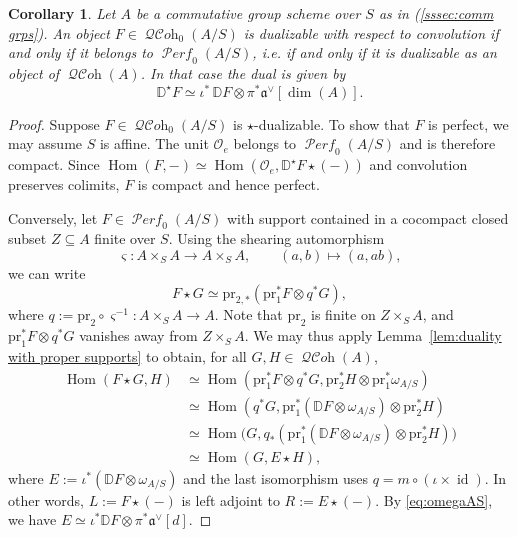 \documentclass[12pt, oneside]{amsart}
\numberwithin{equation}{section}
\newtheorem{corollary}[subsubsection]{Corollary}
\theoremstyle{remark}
\theoremstyle{plain}
\DeclareMathOperator{\QCOH}{\mathcal{QC}\textit{oh}}
\DeclareMathOperator{\PERF}{\mathcal{P}\textit{erf}}
\DeclareMathOperator{\Hom}{Hom}
\newcommand{\frav}{\mathfrak{a}^\vee}
\newcommand{\OO}{\mathcal{O}}
\newcommand{\pr}{\mathrm{pr}}
\begin{document}
\begin{corollary}\label{duals} Let $A$ be a commutative group scheme over $S$ as in (\ref{sssec:comm grps}). An object $F \in \QCOH_0(A/S)$ is dualizable with respect to convolution if and only if it belongs to $\PERF_{0}(A/S)$, i.e. if and only if it is dualizable as an object of $\QCOH(A)$. In that case the dual is given by $$\mathbb{D}^{\star}F\simeq \iota^{*}\,\mathbb{D}F \otimes \pi^{*}\frav[\operatorname{dim}(A)].$$\end{corollary}

\begin{proof}
Suppose $F \in \QCOH_0(A/S)$ is $\star$-dualizable.
To show that $F$ is perfect, we may assume $S$ is affine.
The unit $\OO_e$ belongs to $\PERF_0(A/S)$ and is therefore compact.
Since $\Hom(F,-) \simeq \Hom(\OO_e, \mathbb{D}^\star F\star(-))$ and convolution preserves colimits, $F$ is compact and hence perfect.

Conversely, let $F \in \PERF_0(A/S)$ with support contained in a cocompact closed subset $Z \subseteq A$ finite over $S$.
Using the shearing automorphism
\[
  \varsigma : A\times_S A \to A\times_S A,
  \qquad (a,b) \mapsto (a,ab),
\]
we can write
\[
  F\star G \simeq \pr_{2,*}(\pr_1^*F\otimes q^*G),
\]
where $q := \pr_2 \circ \varsigma^{-1} : A \times_S A \to A$.
Note that $\pr_2$ is finite on $Z\times_S A$, and $\pr_1^*F\otimes q^*G$ vanishes away from $Z\times_S A$.
We may thus apply Lemma~\ref{lem:duality with proper supports} to obtain, for all $G,H\in\QCOH(A)$,
\begin{align*}
  \Hom(F\star G,H)
  &\simeq \Hom(\pr_1^*F\otimes q^*G,
               \pr_2^*H\otimes\pr_1^*\omega_{A/S})\\
  &\simeq \Hom(q^*G,
               \pr_1^*(\mathbb{D}F\otimes\omega_{A/S})
               \otimes\pr_2^*H)\\
  &\simeq \Hom\bigl(G,
               q_*(\pr_1^*(\mathbb{D}F\otimes\omega_{A/S})
               \otimes\pr_2^*H)\bigr)\\
  &\simeq \Hom(G,E\star H),
\end{align*}
where $E := \iota^*(\mathbb{D}F\otimes\omega_{A/S})$ and the last isomorphism uses $q=m\circ(\iota\times\operatorname{id})$.
In other words, $L := F\star(-)$ is left adjoint to $R := E\star(-)$.
By \eqref{eq:omegaAS}, we have $E \simeq \iota^*\mathbb{D}F\otimes\pi^*\frav[d]$.


\end{proof}
\end{document}
